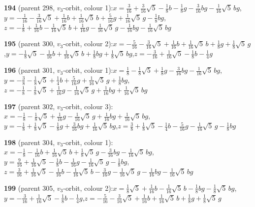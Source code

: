 \documentclass[10pt]{article}
\begin{document}
{\noindent\textbf{194} (parent 298, $v_3$-orbit, colour 1):\quad $x=\tfrac{3}{16}+\tfrac{3}{16}\sqrt5-\tfrac{1}{8}b-\tfrac{1}{8}g-\tfrac{3}{16}bg-\tfrac{1}{16}\sqrt5\,bg$,\quad $y=-\tfrac{1}{16}-\tfrac{3}{16}\sqrt5+\tfrac{1}{16}b+\tfrac{1}{16}\sqrt5\,b+\tfrac{5}{16}g+\tfrac{1}{16}\sqrt5\,g-\tfrac{1}{8}bg$,\quad $z=-\tfrac{1}{8}+\tfrac{1}{16}b-\tfrac{1}{16}\sqrt5\,b+\tfrac{1}{16}g-\tfrac{1}{16}\sqrt5\,g-\tfrac{1}{16}bg-\tfrac{1}{16}\sqrt5\,bg$\par\smallskip
\noindent\textbf{195} (parent 300, $v_3$-orbit, colour 2):\quad $x=-\tfrac{5}{16}-\tfrac{3}{16}\sqrt5+\tfrac{1}{16}b+\tfrac{1}{16}\sqrt5\,b+\tfrac{1}{8}g+\tfrac{1}{8}\sqrt5\,g$,\quad $y=-\tfrac{1}{8}\sqrt5-\tfrac{1}{16}b+\tfrac{1}{16}\sqrt5\,b+\tfrac{1}{8}bg+\tfrac{1}{8}\sqrt5\,bg$,\quad $z=-\tfrac{3}{16}+\tfrac{1}{16}\sqrt5-\tfrac{1}{8}b-\tfrac{1}{4}g$\par\smallskip
\noindent\textbf{196} (parent 301, $v_3$-orbit, colour 1):\quad $x=\tfrac{1}{8}-\tfrac{1}{8}\sqrt5+\tfrac{1}{8}g-\tfrac{3}{16}bg-\tfrac{1}{16}\sqrt5\,bg$,\quad $y=-\tfrac{3}{8}-\tfrac{1}{8}\sqrt5+\tfrac{1}{4}b+\tfrac{5}{16}g+\tfrac{1}{16}\sqrt5\,g+\tfrac{1}{8}bg$,\quad $z=-\tfrac{1}{8}-\tfrac{1}{8}\sqrt5+\tfrac{1}{16}g-\tfrac{1}{16}\sqrt5\,g+\tfrac{1}{16}bg+\tfrac{1}{16}\sqrt5\,bg$\par\smallskip
\noindent\textbf{197} (parent 302, $v_3$-orbit, colour 3):\quad $x=-\tfrac{1}{8}-\tfrac{1}{8}\sqrt5+\tfrac{1}{16}g-\tfrac{1}{16}\sqrt5\,g+\tfrac{1}{16}bg+\tfrac{1}{16}\sqrt5\,bg$,\quad $y=-\tfrac{1}{8}+\tfrac{1}{8}\sqrt5-\tfrac{1}{8}g+\tfrac{3}{16}bg+\tfrac{1}{16}\sqrt5\,bg$,\quad $z=\tfrac{3}{8}+\tfrac{1}{8}\sqrt5-\tfrac{1}{4}b-\tfrac{5}{16}g-\tfrac{1}{16}\sqrt5\,g-\tfrac{1}{8}bg$\par\smallskip
\noindent\textbf{198} (parent 304, $v_3$-orbit, colour 1):\quad $x=-\tfrac{1}{8}-\tfrac{1}{16}b+\tfrac{1}{16}\sqrt5\,b+\tfrac{1}{8}\sqrt5\,g-\tfrac{3}{16}bg-\tfrac{1}{16}\sqrt5\,bg$,\quad $y=\tfrac{9}{16}+\tfrac{1}{16}\sqrt5-\tfrac{1}{8}b-\tfrac{1}{16}g-\tfrac{1}{16}\sqrt5\,g-\tfrac{1}{8}bg$,\quad $z=\tfrac{3}{16}+\tfrac{1}{16}\sqrt5-\tfrac{1}{16}b-\tfrac{1}{16}\sqrt5\,b-\tfrac{3}{16}g-\tfrac{1}{16}\sqrt5\,g-\tfrac{1}{16}bg-\tfrac{1}{16}\sqrt5\,bg$\par\smallskip
\noindent\textbf{199} (parent 305, $v_3$-orbit, colour 2):\quad $x=\tfrac{1}{8}\sqrt5+\tfrac{1}{16}b-\tfrac{1}{16}\sqrt5\,b-\tfrac{1}{8}bg-\tfrac{1}{8}\sqrt5\,bg$,\quad $y=-\tfrac{3}{16}+\tfrac{1}{16}\sqrt5-\tfrac{1}{8}b-\tfrac{1}{4}g$,\quad $z=-\tfrac{5}{16}-\tfrac{3}{16}\sqrt5+\tfrac{1}{16}b+\tfrac{1}{16}\sqrt5\,b+\tfrac{1}{8}g+\tfrac{1}{8}\sqrt5\,g$\par\smallskip
}
\end{document}
